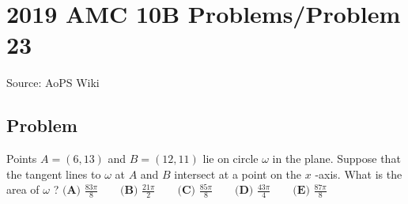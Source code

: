 \documentclass[12pt]{article}
\begin{document}
\section*{{2019 AMC 10B Problems/Problem 23}}
Source: AoPS Wiki

\subsection*{Problem}
Points $A=(6,13)$ and $B=(12,11)$ lie on circle $\omega$ in the plane. Suppose that the tangent lines to $\omega$ at $A$ and $B$ intersect at a point on the $x$ -axis. What is the area of $\omega$ ? $\textbf{(A) }\frac{83\pi}{8}\qquad\textbf{(B) }\frac{21\pi}{2}\qquad\textbf{(C) } \frac{85\pi}{8}\qquad\textbf{(D) }\frac{43\pi}{4}\qquad\textbf{(E) }\frac{87\pi}{8}$
\end{document}
